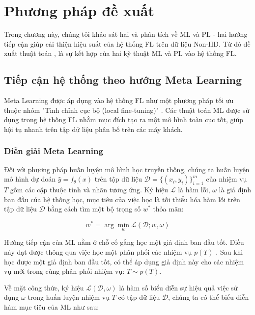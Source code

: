 \chapter{Phương pháp đề xuất}
\label{Chapter3}

Trong chương này, chúng tôi khảo sát hai và phân tích về ML và PL - hai hướng tiếp cận giúp cải thiện hiệu suất của hệ thống FL trên dữ liệu Non-IID. Từ đó đề xuất thuật toán , là sự kết hợp của hai kỹ thuật ML và PL vào hệ thống FL.

\section{Tiếp cận hệ thống theo hướng Meta Learning}

Meta Learning được áp dụng vào hệ thống FL như một phương pháp tối ưu thuộc nhóm "Tinh chỉnh cục bộ (local fine-tuning)" \cite{zhu2021federated}. Các thuật toán ML được sử dụng trong hệ thống FL nhằm mục đích tạo ra một mô hình toàn cục tốt, giúp hội tụ nhanh trên tập dữ liệu phân bố trên các máy khách.

\subsection{Diễn giải Meta Learning}

Đối với phương pháp huấn luyện mô hình học truyền thống, chúng ta huấn luyện mô hình dự đoán $\hat{y} = f_\theta(x)$ trên tập dữ liệu $\mathcal{D} = \{ (x_i, y_i)\}_{i=1}^m$ của nhiệm vụ $T$ gồm các cặp thuộc tính và nhãn tương ứng. Ký hiệu $\mathcal{L}$ là hàm lỗi, $\omega$ là giả định ban đầu của hệ thống học, mục tiêu của việc học là tối thiểu hóa hàm lỗi trên tập dữ liệu $\mathcal{D}$ bằng cách tìm một bộ trọng số $w^*$ thỏa mãn:

\begin{equation}
    w^* = \arg \min_w \mathcal{L}(\mathcal{D}; w, \omega)
\end{equation}

Hướng tiếp cận của ML nằm ở chỗ cố gắng học một giả định ban đầu tốt. Điều này đạt được thông qua việc học một phân phối các nhiệm vụ $p(T)$ \cite{hospedales2020meta}. Sau khi học được một giả định ban đầu tốt, có thể áp dụng giả định này cho các nhiệm vụ mới trong cùng phân phối nhiệm vụ: $T \sim p(T)$.

Về mặt công thức, ký hiệu $\mathcal{L}(\mathcal{D}, \omega)$ là hàm số biểu diễn sự hiệu quả việc sử dụng $\omega$ trong huấn luyện nhiệm vụ $T$ có tập dữ liệu $\mathcal{D}$, chúng ta có thể biểu diễn hàm mục tiêu của ML như sau:

